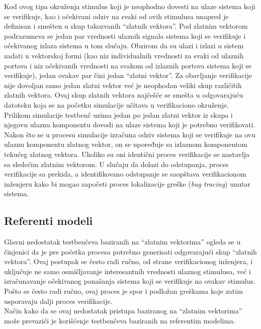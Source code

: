 Kod ovog tipa okruženja stimulus koji je neophodno dovesti na ulaze sistema koji
se verifikuje, kao i očekivani odziv na svaki od ovih stimulusa unapred je
definisan i smešten u skup takozvanih ``zlatnih vektora''. Pod zlatnim vektorom
podrazumeva se jedan par vrednosti ulaznih signala sistema koji se verifikuje i
očekivanog izlaza sistema u tom slučaju. Obzirom da su ulazi i izlazi u sistem
zadati u vektorskoj formi (kao niz individualnih vrednosti za svaki od ulaznih
portova i niz očekivanih vrednosti na svakom od izlaznih portova sistema koji se
verifikuje), jedan ovakav par čini jedan ``zlatni vektor''. Za obavljanje
verifikacije nije dovoljan samo jedan zlatni vektor već je neophodan veliki skup
različitih zlatnih vektora. Ovaj skup zlatnih vektora najčešće se smešta u
odgovarajuću datoteku koja se na početku simulacije učitava u verifikaciono
okruženje. Prilikom simulacije testbenč uzima jedan po jedan zlatni vektor iz
skupa i njegovu ulaznu komponentu dovodi na ulaze sistema koji je potrebno
verifikovati. Nakon što se u procesu simulacije izračuna odziv sistema koji se
verifikuje na ovu ulaznu komponentu zlatnog vektor, on se upoređuje sa izlaznom
komponentom tekućeg zlatnog vektora. Ukoliko su oni identični proces
verifikacije se nastavlja sa sledećim zlatnim vektorom. U slučaju da dolazi do
odstupanja, proces verifikacije sa prekida, a identifikovano odstupanje se
saopštava verifikacionom inženjeru kako bi mogao započeti proces lokalizacije
greške (\emph{bug tracing}) unutar sistema.


\subsection{Referenti modeli}

Glavni nedostatak testbenčeva baziranih na ``zlatnim vektorima'' ogleda se u
činjenici da je pre početka procesa potrebno generisati odgovarajući skup
``zlatnih vektora''. Ovaj postupak se često radi ručno, od strane verifikacionog
inženjera, i uključuje ne samo osmišljavanje interesantnih vrednosti ulaznog
stimulusa, već i izračunavanje očekivanog ponašanja sistema koji se verifikuje
na ovakav stimulus. Pošto se često radi ručno, ovaj proces je spor i podložan
greškama koje zatim usporavaju dalji proces verifikacije.\\

Način kako da se ovaj nedostatak pristupa baziranog na ``zlatnim vektorima''
može prevazići je korišćenje testbenčeva baziranih na referentim modelima.\\

